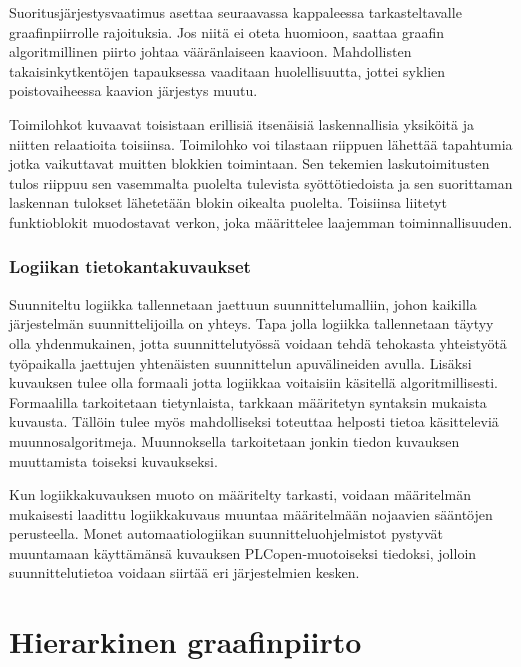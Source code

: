 \documentclass[finnish,12pt]{article}
\begin{document}
Suoritusjärjestysvaatimus asettaa seuraavassa kappaleessa tarkasteltavalle graafinpiirrolle rajoituksia.
Jos niitä ei oteta huomioon, saattaa graafin algoritmillinen piirto johtaa vääränlaiseen kaavioon.
Mahdollisten takaisinkytkentöjen tapauksessa vaaditaan huolellisuutta, jottei syklien poistovaiheessa kaavion järjestys muutu.

Toimilohkot kuvaavat toisistaan erillisiä itsenäisiä laskennallisia yksiköitä
ja niitten relaatioita toisiinsa. Toimilohko voi tilastaan riippuen lähettää
tapahtumia jotka vaikuttavat muitten blokkien toimintaan. Sen tekemien
laskutoimitusten tulos riippuu sen vasemmalta puolelta tulevista
syöttötiedoista ja sen suorittaman laskennan tulokset lähetetään blokin oikealta puolelta.
Toisiinsa liitetyt funktioblokit muodostavat verkon, joka määrittelee laajemman toiminnallisuuden.


		\subsubsection{Logiikan tietokantakuvaukset}

Suunniteltu logiikka tallennetaan jaettuun suunnittelumalliin, johon kaikilla järjestelmän suunnittelijoilla on yhteys.
Tapa jolla logiikka tallennetaan täytyy olla yhdenmukainen, jotta suunnittelutyössä voidaan tehdä tehokasta yhteistyötä työpaikalla jaettujen yhtenäisten suunnittelun apuvälineiden avulla.
Lisäksi kuvauksen tulee olla formaali jotta logiikkaa voitaisiin käsitellä algoritmillisesti.
Formaalilla tarkoitetaan tietynlaista, tarkkaan määritetyn syntaksin mukaista kuvausta.
Tällöin tulee myös mahdolliseksi toteuttaa helposti tietoa käsitteleviä muunnosalgoritmeja.
Muunnoksella tarkoitetaan jonkin tiedon kuvauksen muuttamista toiseksi kuvaukseksi.

Kun logiikkakuvauksen muoto on määritelty tarkasti, voidaan määritelmän mukaisesti laadittu logiikkakuvaus muuntaa määritelmään nojaavien sääntöjen perusteella.
Monet automaatiologiikan suunnitteluohjelmistot pystyvät muuntamaan käyttämänsä kuvauksen PLCopen-muotoiseksi tiedoksi, jolloin suunnittelutietoa voidaan siirtää eri järjestelmien kesken.



	\clearpage
	\section{Hierarkinen graafinpiirto}
	
\end{document}
